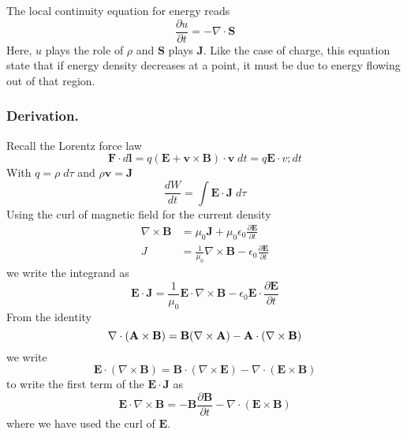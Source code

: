 \documentclass[../../../main.tex]{subfiles}
\begin{document}
The local continuity equation for energy reads
\begin{equation*}
    \frac{\partial u}{\partial t}=-\nabla\cdot\mathbf{S}
\end{equation*}
Here, $u$ plays the role of $\rho$ and $\mathbf{S}$ plays $\mathbf{J}$.
Like the case of charge, this equation state that if energy density decreases at a point, it must be due to energy flowing out of that region.
\subsubsection{Derivation.}
Recall the Lorentz force law
\begin{equation*}
    \mathbf{F}\cdot d\mathbf{l}=q(\mathbf{E}+\mathbf{v}\times \mathbf{B})\cdot\mathbf{v}\;dt=q\mathbf{E}\cdot v;dt
\end{equation*}
With $q=\rho\;d\tau$ and $\rho\mathbf{v}=\mathbf{J}$
\begin{equation*}
    \frac{dW}{dt}=\int \mathbf{E}\cdot\mathbf{J}\;d\tau
\end{equation*}
Using the curl of magnetic field for the current density
\begin{align*}
    \nabla\times\mathbf{B} & =\mu_0\mathbf{J}+\mu_0\epsilon_0\frac{\partial \mathbf{E}}{\partial t}                   \\
    J                      & =\frac{1}{\mu_0}\nabla\times \mathbf{B}-\epsilon_0\frac{\partial \mathbf{E}}{\partial t}
\end{align*}
we write the integrand as
\begin{equation*}
    \mathbf{E}\cdot\mathbf{J}=\frac{1}{\mu_0}\mathbf{E}\cdot\nabla\times\mathbf{B}-\epsilon_0\mathbf{E}\cdot\frac{\partial \mathbf{E}}{\partial t}
\end{equation*}
From the identity
\begin{equation*}
    \nabla\cdot(\mathbf{A}\times\mathbf{B})=\mathbf{B}(\nabla\times\mathbf{A})-\mathbf{A}\cdot(\nabla\times\mathbf{B})
\end{equation*}
we write
\begin{equation*}
    \mathbf{E}\cdot(\nabla\times\mathbf{B})=\mathbf{B}\cdot(\nabla\times\mathbf{E})-\nabla\cdot(\mathbf{E}\times\mathbf{B})
\end{equation*}
to write the first term of the $\mathbf{E}\cdot\mathbf{J}$ as
\begin{equation*}
    \mathbf{E}\cdot\nabla\times\mathbf{B}=-\mathbf{B}\frac{\partial \mathbf{B}}{\partial t}-\nabla\cdot(\mathbf{E}\times \mathbf{B})
\end{equation*}
where we have used the curl of $\mathbf{E}$.
\end{document}
